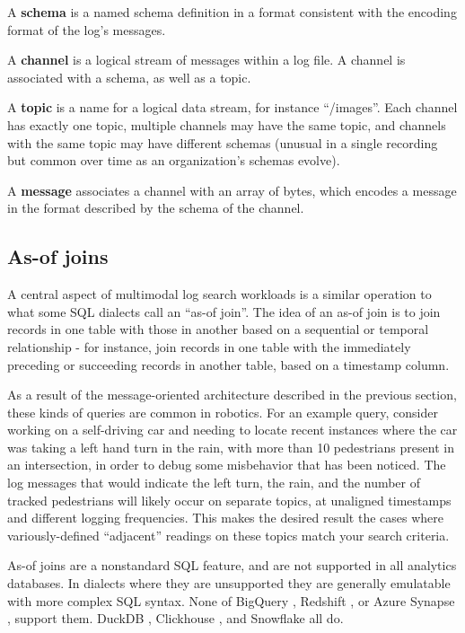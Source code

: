 \documentclass[9pt,twocolumn]{article}
\newcommand{\q}[1]{``#1''}
\begin{document}
    A \textbf{schema} is a named schema definition in a format consistent with the
    encoding format of the log’s messages.

    A \textbf{channel} is a logical stream of messages within a log file. A channel is
    associated with a schema, as well as a topic.

    A \textbf{topic} is a name for a logical data stream, for instance \q{/images}. Each
    channel has exactly one topic, multiple channels may have the same topic, and
    channels with the same topic may have different schemas (unusual in a single
    recording but common over time as an organization’s schemas evolve).

    A \textbf{message} associates a channel with an array of bytes, which encodes a
    message in the format described by the schema of the channel.

    \subsection{As-of joins}
    A central aspect of multimodal log search workloads is a similar operation to
    what some SQL dialects call an \q{as-of join}. The idea of an as-of join is
    to join records in one table with those in another based on a sequential or
    temporal relationship - for instance, join records in one table with the
    immediately preceding or succeeding records in another table, based on a
    timestamp column.

    As a result of the message-oriented architecture described in the previous
    section, these kinds of queries are common in robotics. For an example query,
    consider working on a self-driving car and needing to locate recent instances
    where the car was taking a left hand turn in the rain, with more than 10
    pedestrians present in an intersection, in order to debug some misbehavior
    that has been noticed. The log messages that would indicate the left turn,
    the rain, and the number of tracked pedestrians will likely occur on separate
    topics, at unaligned timestamps and different logging frequencies. This
    makes the desired result the cases where variously-defined \q{adjacent}
    readings on these topics match your search criteria.

    As-of joins are a nonstandard SQL feature, and are not supported in all
    analytics databases. In dialects where they are unsupported they are
    generally emulatable with more complex SQL syntax. None of BigQuery
    \cite{bigquery}, Redshift \cite{redshift}, or Azure Synapse \cite{synapse},
    support them.  DuckDB \cite{duckdb}, Clickhouse \cite{clickhouse}, and
    Snowflake \cite{snowflake} all do.
\end{document}
